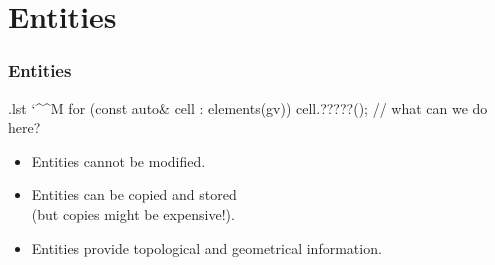 \documentclass[ignorenonframetext,11pt]{beamer}
\makeatletter
\theoremstyle{definition}
\newenvironment{codeblock}{%
  \begin{tcolorbox}[size=small,oversize,boxrule=0pt,opacityframe=0,colback=blue!30!black!5!white]}{%
  \end{tcolorbox}}
\newenvironment{cppcode}{%
  \begingroup
  \@bsphack
  \immediate\openout\lstvrb@out\jobname.lst
  \let\do\@makeother\dospecials\catcode`\^^M\active
  \def\verbatim@processline{%
    \immediate\write\lstvrb@out{\the\verbatim@line}}%
  \verbatim@start}{%
  \immediate\closeout\lstvrb@out
  \@esphack
  \endgroup
  \begin{codeblock}
    \vspace*{-1ex}
    
    \vspace*{-1ex}
  \end{codeblock}}
\makeatother
\begin{document}


\section{Entities}

\begin{frame}[fragile] \frametitle{Entities}


  \begin{cppcode}
for (const auto& cell : elements(gv)) {
  cell.?????(); // what can we do here?
}
  \end{cppcode}

  \pause
  \begin{itemize}
  \item Entities cannot be modified.
  \item Entities can be copied and stored\\(but copies might be expensive!).
    \pause
  \item Entities provide topological and geometrical information.
  \end{itemize}
\end{frame}
\end{document}
